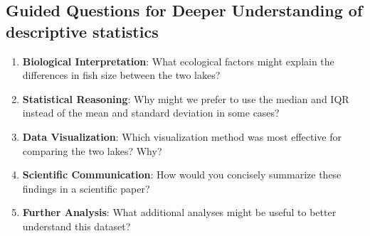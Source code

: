 \documentclass[
]{article}
\begin{document}
\subsection{Guided Questions for Deeper Understanding of descriptive
statistics}\label{guided-questions-for-deeper-understanding-of-descriptive-statistics}

\begin{enumerate}
\def\labelenumi{\arabic{enumi}.}
\item
  \textbf{Biological Interpretation}: What ecological factors might
  explain the differences in fish size between the two lakes?
\item
  \textbf{Statistical Reasoning}: Why might we prefer to use the median
  and IQR instead of the mean and standard deviation in some cases?
\item
  \textbf{Data Visualization}: Which visualization method was most
  effective for comparing the two lakes? Why?
\item
  \textbf{Scientific Communication}: How would you concisely summarize
  these findings in a scientific paper?
\item
  \textbf{Further Analysis}: What additional analyses might be useful to
  better understand this dataset?
\end{enumerate}
\end{document}
